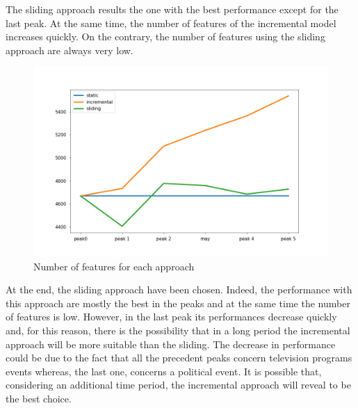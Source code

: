 \noindent
The sliding approach results the one with the best performance except for the last peak. At the same time, the number of features of the incremental model increases quickly. On the contrary, the number of features using the sliding approach are always very low. 

\begin{figure}[H]
    \centering
    \includegraphics[width= 1\textwidth]{images/monitoring/features_for_model_ComplementNB.png}
    \caption{Number of features for each approach} 
    \label{online-monitoring-features}
\end{figure}

\noindent
At the end, the sliding approach have been chosen. Indeed, the performance with this approach are mostly the best in the peaks and at the same time the number of features is low. However, in the last peak its performances decrease quickly and, for this reason, there is the possibility that in a long period the incremental approach will be more suitable than the sliding. The decrease in performance could be due to the fact that all the precedent peaks concern television programs events whereas, the last one, concerns a political event. It is possible that, considering an additional time period, the incremental approach will reveal to be the best choice.  

